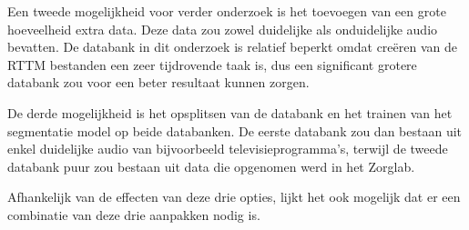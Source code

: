Een tweede mogelijkheid voor verder onderzoek is het toevoegen van een grote hoeveelheid extra data. Deze data zou zowel duidelijke als onduidelijke audio bevatten. De databank in dit onderzoek is relatief beperkt omdat creëren van de RTTM bestanden een zeer tijdrovende taak is, dus een significant grotere databank zou voor een beter resultaat kunnen zorgen.

De derde mogelijkheid is het opsplitsen van de databank en het trainen van het segmentatie model op beide databanken. De eerste databank zou dan bestaan uit enkel duidelijke audio van bijvoorbeeld televisieprogramma's, terwijl de tweede databank puur zou bestaan uit data die opgenomen werd in het Zorglab.

Afhankelijk van de effecten van deze drie opties, lijkt het ook mogelijk dat er een combinatie van deze drie aanpakken nodig is.